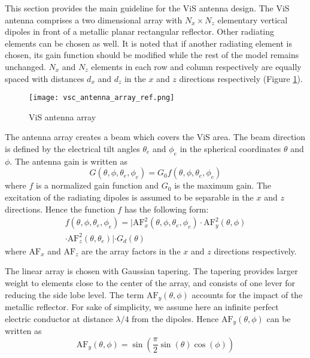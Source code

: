 \documentclass[conference]{IEEEtran}
\begin{document}
	This section provides the main guideline for the \ac{ViS} antenna design. The \ac{ViS} antenna comprises a two dimensional array with $N_x \times N_z$ elementary vertical dipoles in front of a metallic planar rectangular reflector. Other radiating elements can be chosen as well. It is noted that if another radiating element is chosen, its gain function should be modified while the rest of the model remains unchanged. $N_x$ and $N_z$  elements in each row and column respectively are equally spaced with distances $d_x$ and $d_z$  in the $x$ and $z$ directions respectively (Figure \ref{fig:ant_array}).

\begin{figure}[!ht]
\centering
\texttt{[image: vsc\_antenna\_array\_ref.png]}
\caption{\ac{ViS} antenna array}
\label{fig:ant_array}
\end{figure}

The antenna array creates a beam which covers the \ac{ViS} area. The beam direction is defined by the electrical tilt angles $\theta_e$  and $\phi_e$ in the spherical coordinates $\theta$ and $\phi$. The antenna gain is written as
	\begin{equation} \label{eq:ant_gain}
		G(\theta,\phi,\theta_e,\phi_e )=G_0 f(\theta,\phi,\theta_e,\phi_e )
	\end{equation}
	where $f$ is a normalized gain function and $G_0$ is the maximum gain. The excitation of the radiating dipoles is assumed to be separable in the $x$ and $z$ directions. Hence the function $f$ has the following form:
\begin{equation} \label{eq:norm_gain_func}
	\begin{split}
	f(\theta,\phi,\theta_e,\phi_e ) =
	| \text{AF}_x^2 (\theta,\phi,\theta_e,\phi_e ) \cdot \text{AF}_y^2 (\theta,\phi) \\
	 \cdot \text{AF}_z^2 (\theta,\theta_e )| \cdot G_d (\theta)
	\end{split}
	\end{equation}
where $\text{AF}_x$ and $\text{AF}_z$ are the array factors in the $x$ and $z$ directions respectively.

	The linear array is chosen with Gaussian tapering. The tapering provides larger weight to elements close to the center of the array, and consists of one lever for reducing the side lobe level. The term $\text{AF}_y (\theta,\phi)$ accounts for the impact of the metallic reflector. For sake of simplicity, we assume here an infinite perfect electric conductor at distance $\lambda/4$ from the dipoles. Hence $\text{AF}_y (\theta,\phi)$ can be written as
\begin{equation} \label{eq:array_factor}
	\text{AF}_y (\theta,\phi) = \sin(\frac{\pi}{2} \sin(\theta) \cos(\phi))
\end{equation}
\end{document}
